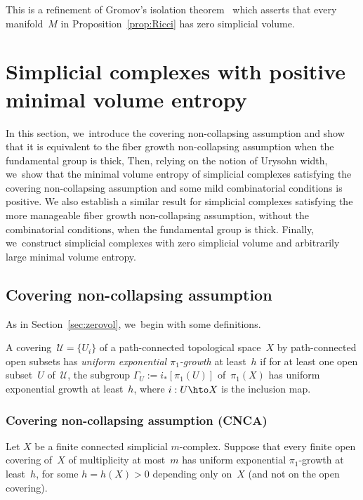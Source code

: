 \begin{remark}
This is a refinement of Gromov's isolation theorem~\cite[\S0.5]{gro82} which asserts that every manifold~$M$ in Proposition~\ref{prop:Ricci} has zero simplicial volume.
\end{remark}

\section{Simplicial complexes with positive minimal volume entropy}

In this section, we~introduce the covering non-collapsing assumption and show that it is equivalent to the fiber growth non-collapsing assumption when the fundamental group is thick,
Then, relying on the notion of Urysohn width, we~show that the minimal volume entropy of simplicial complexes satisfying the covering non-collapsing assumption and some mild combinatorial conditions is positive.
We also establish a similar result for simplicial complexes satisfying the more manageable fiber growth non-collapsing assumption, without the combinatorial conditions, when the fundamental group is thick.
Finally, we~construct simplicial complexes with zero simplicial volume and arbitrarily large minimal volume entropy.

\subsection{Covering non-collapsing assumption} \label{sec:positivevol}

As in Section~\ref{sec:zerovol}, we~begin with some definitions.

\begin{definition} \label{def:exp.cover}
A covering~$\mathcal{U} = \{U_i\}$ of a path-connected topological space~$X$ by path-connected open subsets has \emph{uniform exponential $\pi_1$-growth} at least~$h$ if for at least one open subset~$U$ of~$\mathcal{U}$, the subgroup $\Gamma_{U}:=i_*[\pi_1(U)]$ of~$\pi_1(X)$ has uniform exponential growth at least~$h$, where \mbox{$i:U \hto X$} is the inclusion map.
\end{definition}

\subsubsection*{Covering non-collapsing assumption (CNCA)}
Let $X$ be a finite connected simplicial $m$\nobreakdash-complex.
Suppose that every finite open covering of~$X$ of multiplicity at most~$m$ has uniform exponential $\pi_1$-growth at least~$h$, for some $h=h(X) >0$ depending only on~$X$ (and not on the open covering).

